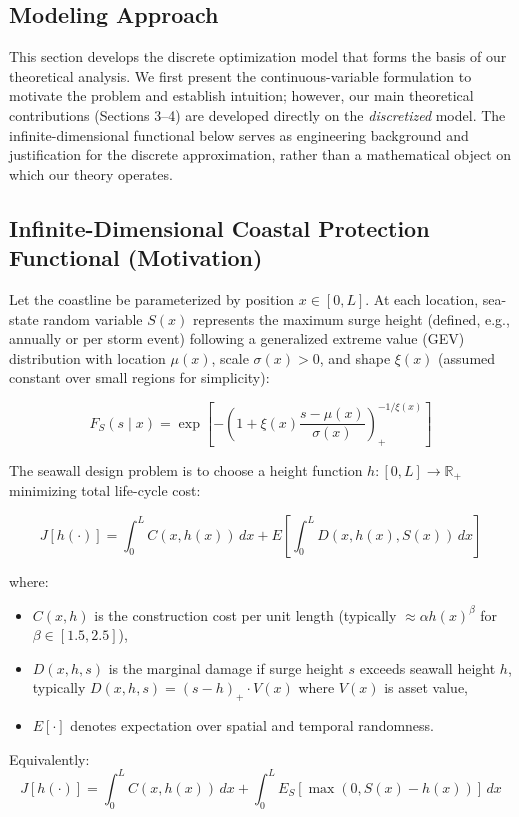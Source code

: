 \documentclass[12pt]{article}
\theoremstyle{definition}
\begin{document}
\subsection*{Modeling Approach}

This section develops the discrete optimization model that forms the basis of our theoretical analysis. We first present the continuous-variable formulation to motivate the problem and establish intuition; however, our main theoretical contributions (Sections 3–4) are developed directly on the \emph{discretized} model. The infinite-dimensional functional below serves as engineering background and justification for the discrete approximation, rather than a mathematical object on which our theory operates.

\subsection{Infinite-Dimensional Coastal Protection Functional (Motivation)}

Let the coastline be parameterized by position $x \in [0,L]$. At each location, sea-state random variable $S(x)$ represents the maximum surge height (defined, e.g., annually or per storm event) following a generalized extreme value (GEV) distribution with location $\mu(x)$, scale $\sigma(x)>0$, and shape $\xi(x)$ (assumed constant over small regions for simplicity):

\[
F_S(s \mid x) = \exp\left[-\left(1+\xi(x)\frac{s-\mu(x)}{\sigma(x)}\right)_+^{-1/\xi(x)}\right]
\]

The seawall design problem is to choose a height function $h:[0,L]\to\mathbb{R}_+$ minimizing total life-cycle cost:

\[
J[h(\cdot)] = \int_0^L C(x, h(x)) \, dx + E\left[\int_0^L D(x, h(x), S(x)) \, dx\right]
\]

where:
\begin{itemize}
    \item $C(x,h)$ is the construction cost per unit length (typically $\approx \alpha h(x)^\beta$ for $\beta \in [1.5, 2.5]$),
    \item $D(x,h,s)$ is the marginal damage if surge height $s$ exceeds seawall height $h$, typically $D(x,h,s) = (s-h)_+ \cdot V(x)$ where $V(x)$ is asset value,
    \item $E[\cdot]$ denotes expectation over spatial and temporal randomness.
\end{itemize}

Equivalently:
\[
J[h(\cdot)] = \int_0^L C(x, h(x)) \, dx + \int_0^L E_S\left[\max(0, S(x)-h(x))\right] \, dx
\]
\end{document}
